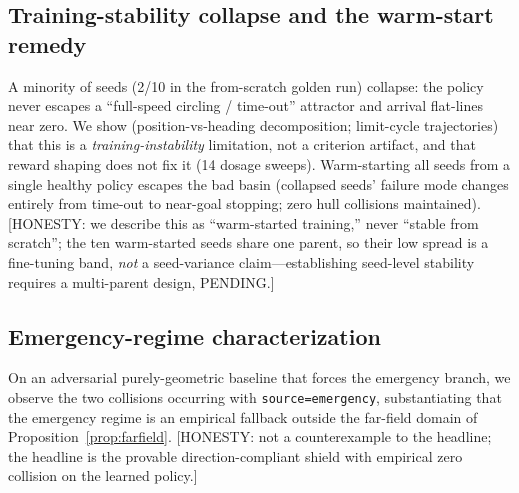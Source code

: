 \documentclass[12pt,letterpaper]{article}
\theoremstyle{remark}\newtheorem*{scope}{Scope and honest limits}
\begin{document}
\subsection{Training-stability collapse and the warm-start remedy}
A minority of seeds (2/10 in the from-scratch golden run) collapse: the policy
never escapes a ``full-speed circling / time-out'' attractor and arrival flat-lines
near zero. We show (position-vs-heading decomposition; limit-cycle trajectories)
that this is a \emph{training-instability} limitation, not a criterion artifact,
and that reward shaping does not fix it (14 dosage sweeps). Warm-starting all seeds
from a single healthy policy escapes the bad basin (collapsed seeds' failure mode
changes entirely from time-out to near-goal stopping; zero hull collisions
maintained). [HONESTY: we describe this as ``warm-started training,'' never
``stable from scratch''; the ten warm-started seeds share one parent, so their
low spread is a fine-tuning band, \emph{not} a seed-variance claim---establishing
seed-level stability requires a multi-parent design, PENDING.]

\subsection{Emergency-regime characterization}
On an adversarial purely-geometric baseline that forces the emergency branch, we
observe the two collisions occurring with \texttt{source=emergency}, substantiating
that the emergency regime is an empirical fallback outside the far-field domain of
Proposition~\ref{prop:farfield}. [HONESTY: not a counterexample to the headline;
the headline is the provable direction-compliant shield with empirical zero
collision on the learned policy.]

\end{document}
